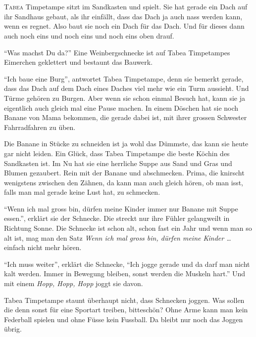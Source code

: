 \chapter*{}
\lettrine[lines=3]{\color{DeepPink}T}{abea} Timpetampe sitzt im Sandkasten und spielt. Sie hat gerade ein Dach auf ihr Sandhaus gebaut, als ihr einfällt, dass das Dach ja auch nass werden kann, wenn es regnet. Also baut sie noch ein Dach für das Dach. Und für dieses dann auch noch eins und noch eins und noch eins oben drauf.

\enquote{Was machst Du da?} Eine Weinbergschnecke ist auf Tabea Timpetampes Eimerchen geklettert und bestaunt das Bauwerk. 

\enquote{Ich baue eine Burg}, antwortet Tabea Timpetampe, denn sie bemerkt gerade, dass das Dach auf dem Dach eines Daches viel mehr wie ein Turm aussieht. Und Türme gehören zu Burgen. Aber wenn sie schon einmal Besuch hat, kann sie ja eigentlich auch gleich mal eine Pause machen. In einem Döschen hat sie noch Banane von Mama bekommen, die gerade dabei ist, mit ihrer grossen Schwester Fahrradfahren zu üben. 

Die Banane in Stücke zu schneiden ist ja wohl das Dümmste, das kann sie heute gar nicht leiden. Ein Glück, dass Tabea Timpetampe die beste Köchin des Sandkasten ist. Im Nu hat sie eine herrliche Suppe aus Sand und Gras und Blumen gezaubert. Rein mit der Banane und abschmecken. Prima, die knirscht wenigstens zwischen den Zähnen, da kann man auch gleich hören, ob man isst, falls man mal gerade keine Lust hat, zu schmecken.

\enquote{Wenn ich mal gross bin, dürfen meine Kinder immer nur Banane mit Suppe essen.}, erklärt sie der Schnecke. Die streckt nur ihre Fühler gelangweilt in Richtung Sonne. Die Schnecke ist schon alt, schon fast ein Jahr und wenn man so alt ist, mag man den Satz \textit{Wenn ich mal gross bin, dürfen meine Kinder \dots} einfach nicht mehr hören.

\enquote{Ich muss weiter}, erklärt die Schnecke, \enquote{Ich jogge gerade und da darf man nicht kalt werden. Immer in Bewegung bleiben, sonst werden die Muskeln hart.} Und mit einem \textit{Hopp, Hopp, Hopp} joggt sie  davon.

Tabea Timpetampe staunt überhaupt nicht, dass Schnecken joggen. Was sollen die denn sonst für eine Sportart treiben, bitteschön? Ohne Arme kann man kein Federball spielen und ohne Füsse kein Fussball. Da bleibt nur noch das Joggen übrig. 


